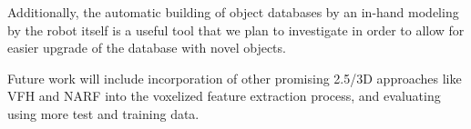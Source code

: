 \documentclass[letterpaper, 10 pt, conference]{sty/ieeeconf}
\begin{document}
Additionally, the automatic building of object databases by an in-hand modeling by the
robot itself is a useful tool that we plan to investigate in order to allow for
easier upgrade of the database with novel objects.

Future work will include incorporation of other promising 2.5/3D approaches like VFH and NARF
into the voxelized feature extraction process, and evaluating using more test and training data.




%

\end{document}
